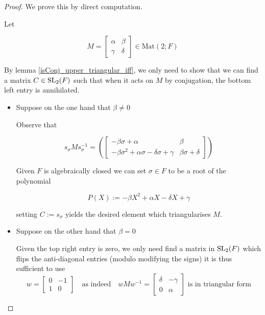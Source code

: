 \begin{proof}
    \leanok
We prove this by direct computation. 

Let 

\[
M = \begin{bmatrix}
\alpha & \beta\\
\gamma & \delta
\end{bmatrix} \in\textrm{Mat}(2; F)
\]

By lemma \ref{isConj_upper_triangular_iff}, we only need to show that we can find a matrix $C \in \operatorname{SL}_2(F)$ such that when it acts on $M$ by conjugation, the bottom left entry is annihilated.

\begin{itemize}
    \item Suppose on the one hand that $\beta \ne 0$
    
    Observe that 
    
    \begin{equation}\label{triang}
        s_\sigma M s_\sigma^{-1} = \left(\begin{bmatrix}
            -\beta \sigma + \alpha & \beta \\
            -\beta \sigma^{2} + \alpha \sigma - \delta \sigma + \gamma & \beta \sigma + \delta
            \end{bmatrix}\right)
    \end{equation}

    Given $F$ is algebraically closed we can set $\sigma \in F$ to be a root of the polynomial

    \[
    P(X) := -\beta X^{2} + \alpha X - \delta X + \gamma 
    \]

    setting $C := s_\sigma$ yields the desired element which triangularises $M$.
    

    \item Suppose on the other hand that $\beta = 0$
    
    Given the top right entry is zero, we only need find a matrix in $\operatorname{SL}_2(F)$ which flips the anti-diagonal entries (modulo modifying the signs)
    it is thus sufficient to use 
        \[
        w = \begin{bmatrix}
        0 & -1\\
        1 & 0
        \end{bmatrix} \quad \text{as indeed} \quad w M w^{-1} = \begin{bmatrix}
            \delta & -\gamma\\
            0 & \alpha
        \end{bmatrix} \text{ is in triangular form} 
        \]
\end{itemize}

\end{proof}


